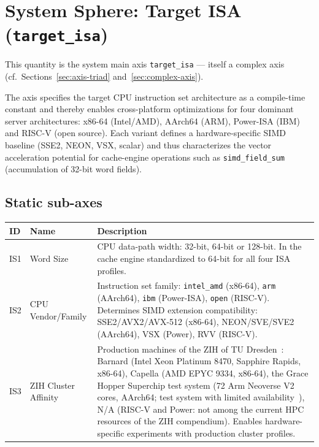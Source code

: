 \section{System Sphere: Target ISA (\texttt{target\_isa})}

This quantity is the system main axis \texttt{target\_isa} --- itself a complex axis (cf.\ Sections~\ref{sec:axis-triad} and~\ref{sec:complex-axis}).

The axis specifies the target CPU instruction set architecture as a compile-time constant and thereby enables cross-platform optimizations for four dominant server architectures: x86-64 (Intel/\allowbreak{}AMD), AArch64 (ARM), Power-ISA (IBM) and RISC-V (open source). Each variant defines a hardware-specific SIMD baseline (SSE2, NEON, VSX, scalar) and thus characterizes the vector acceleration potential for cache-engine operations such as \texttt{simd\_\allowbreak{}field\_\allowbreak{}sum} (accumulation of 32-bit word fields).

\subsection*{Static sub-axes}

\begin{scriptsize}
\begin{longtable}{@{}>{\raggedright\arraybackslash}p{1.8cm} >{\raggedright\arraybackslash}p{3.2cm} >{\raggedright\arraybackslash}p{8.5cm}@{}}
\toprule
ID & Name & Description \\
\midrule
\endhead%
IS1 & Word Size & CPU data-path width: 32-bit, 64-bit or 128-bit. In the cache engine standardized to 64-bit for all four ISA profiles. \\
IS2 & CPU Vendor/\allowbreak{}Family & Instruction set family: \texttt{intel\_\allowbreak{}amd} (x86-64), \texttt{arm} (AArch64), \texttt{ibm} (Power-ISA), \texttt{open} (RISC-V). Determines SIMD extension compatibility: SSE2/\allowbreak{}AVX2/\allowbreak{}AVX-512 (x86-64), NEON/\allowbreak{}SVE/\allowbreak{}SVE2 (AArch64), VSX (Power), RVV (RISC-V). \\
IS3 & ZIH Cluster Affinity & Production machines of the ZIH of TU Dresden~\cite{zih_hpc_compendium_hardware}: Barnard (Intel Xeon Platinum 8470, Sapphire Rapids, x86-64), Capella (AMD EPYC 9334, x86-64), the Grace Hopper Superchip test system (72 Arm Neoverse V2 cores, AArch64; test system with limited availability~\cite{zih_hpc_compendium_gh200}), N/\allowbreak{}A (RISC-V and Power: not among the current HPC resources of the ZIH compendium). Enables hardware-specific experiments with production cluster profiles. \\
\bottomrule
\end{longtable}
\end{scriptsize}

